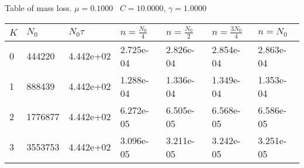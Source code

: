 \begin{center}
Table of mass loss. $\mu = 0.1000$ \, $C = 10.0000$, $\gamma = 1.0000$
  
\begin{tabular}{|p{0.8in}|p{0.8in}|p{0.8in}|p{0.8in}|p{0.8in}|p{0.8in}|p{0.8in}|} \hline
$K$ &$N_0$ &$N_0 \tau$ &$n = \frac{N_0}{4}$ &$n = \frac{N_0}{2}$ &$n = \frac{3N_0}{4}$ &$n = N_0$ \\ \hline 
0 &444220 &4.442e+02 &2.725e-04 &2.826e-04 &2.854e-04 &2.863e-04 \\ \hline 
1 &888439 &4.442e+02 &1.288e-04 &1.336e-04 &1.349e-04 &1.353e-04 \\ \hline 
2 &1776877 &4.442e+02 &6.272e-05 &6.505e-05 &6.568e-05 &6.586e-05 \\ \hline 
3 &3553753 &4.442e+02 &3.096e-05 &3.211e-05 &3.242e-05 &3.251e-05 \\ \hline 

\end{tabular}\\[20pt]
\end{center}
